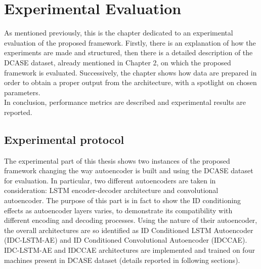 \chapter{Experimental Evaluation}
As mentioned previously, this is the chapter dedicated to an experimental evaluation of the proposed framework. Firstly, there is an explanation of how the experiments are made and structured, then there is a detailed description of the DCASE dataset, already mentioned in Chapter 2, on which the proposed framework is evaluated. Successively, the chapter shows how data are prepared in order to obtain a proper output from the architecture, with a spotlight on chosen parameters.\\
In conclusion, performance metrics are described and experimental results are reported.
\section{Experimental protocol}
The experimental part of this thesis shows two instances of the proposed framework changing the way autoencoder is built and using the DCASE dataset for evaluation. In particular, two different autoencoders are taken in consideration: LSTM encoder-decoder architecture and convolutional autoencoder. The purpose of this part is in fact to show the ID conditioning effects as autoencoder layers varies, to demonstrate its compatibility with different encoding and decoding processes. Using the nature of their autoencoder, the overall architectures are so identified as ID Conditioned LSTM Autoencoder (IDC-LSTM-AE) and ID Conditioned Convolutional Autoencoder (IDCCAE). IDC-LSTM-AE and IDCCAE architectures are implemented and trained on four machines present in DCASE dataset (details reported in following sections).
